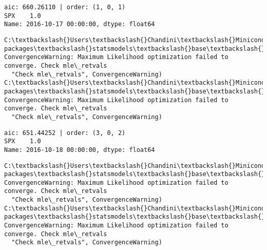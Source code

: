 \documentclass[11pt]{article}
\begin{document}
    \begin{Verbatim}[commandchars=\\\{\}]
aic: 660.26110 | order: (1, 0, 1)
SPX    1.0
Name: 2016-10-17 00:00:00, dtype: float64

    \end{Verbatim}

    \begin{Verbatim}[commandchars=\\\{\}]
C:\textbackslash{}Users\textbackslash{}Chandini\textbackslash{}Miniconda3\textbackslash{}envs\textbackslash{}auquan\textbackslash{}lib\textbackslash{}site-packages\textbackslash{}statsmodels\textbackslash{}base\textbackslash{}model.py:496: ConvergenceWarning: Maximum Likelihood optimization failed to converge. Check mle\_retvals
  "Check mle\_retvals", ConvergenceWarning)
C:\textbackslash{}Users\textbackslash{}Chandini\textbackslash{}Miniconda3\textbackslash{}envs\textbackslash{}auquan\textbackslash{}lib\textbackslash{}site-packages\textbackslash{}statsmodels\textbackslash{}base\textbackslash{}model.py:496: ConvergenceWarning: Maximum Likelihood optimization failed to converge. Check mle\_retvals
  "Check mle\_retvals", ConvergenceWarning)

    \end{Verbatim}

    \begin{Verbatim}[commandchars=\\\{\}]
aic: 651.44252 | order: (3, 0, 2)
SPX    1.0
Name: 2016-10-18 00:00:00, dtype: float64

    \end{Verbatim}

    \begin{Verbatim}[commandchars=\\\{\}]
C:\textbackslash{}Users\textbackslash{}Chandini\textbackslash{}Miniconda3\textbackslash{}envs\textbackslash{}auquan\textbackslash{}lib\textbackslash{}site-packages\textbackslash{}statsmodels\textbackslash{}base\textbackslash{}model.py:496: ConvergenceWarning: Maximum Likelihood optimization failed to converge. Check mle\_retvals
  "Check mle\_retvals", ConvergenceWarning)
C:\textbackslash{}Users\textbackslash{}Chandini\textbackslash{}Miniconda3\textbackslash{}envs\textbackslash{}auquan\textbackslash{}lib\textbackslash{}site-packages\textbackslash{}statsmodels\textbackslash{}base\textbackslash{}model.py:496: ConvergenceWarning: Maximum Likelihood optimization failed to converge. Check mle\_retvals
  "Check mle\_retvals", ConvergenceWarning)

    \end{Verbatim}
\end{document}
